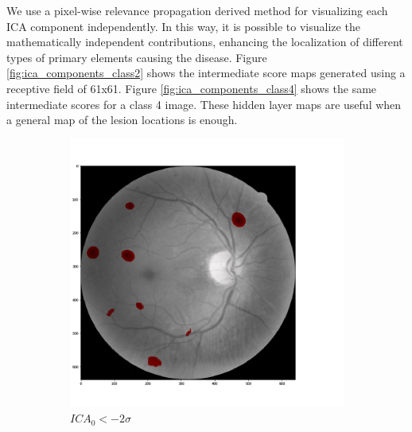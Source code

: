 \documentclass[preprint]{elsarticle}
\theoremstyle{definition} %
\theoremstyle{remark}
\begin{document}
We use a pixel-wise relevance propagation derived method for visualizing each ICA component independently. In this way, it is possible to visualize the mathematically independent contributions, enhancing the localization of different types of primary elements causing the disease. Figure \ref{fig:ica_components_class2} shows the intermediate score maps generated using a receptive field of 61x61. Figure \ref{fig:ica_components_class4} shows the same intermediate scores for a class 4 image. These hidden layer maps are useful when a general map of the lesion locations is enough.

\begin{figure}[h!]
	\centering
	\begin{subfigure}[b]{0.32\textwidth}
		\centering
		\includegraphics[width=\textwidth]{figures/img_t2_p2/rf61/ica0.png}
		\caption{$ICA_0 < - 2 \sigma$}	
	\end{subfigure}
	\begin{subfigure}[b]{0.32\textwidth}
		\centering

\end{subfigure}
\end{figure}
\end{document}
